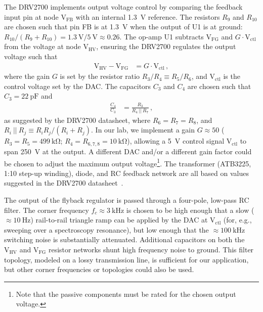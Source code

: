 \documentclass[aip,rsi,reprint]{revtex4-1} %
\begin{document}
The DRV2700 implements output voltage control by comparing the feedback input pin at node $\text{V}_\text{FB}$ with an internal \SI{1.3}{\volt} reference.
The resistors $R_9$ and $R_{10}$ are chosen such that pin FB is at \SI{1.3}{\volt} when the output of U1 is at ground: $R_{10}/(R_9+R_{10}) = \SI{1.3}{\volt}/\SI{5}{\volt} \approx \num{0.26}$.
The op-amp U1 subtracts $\text{V}_\text{FG}$ and $G\cdot \text{V}_\text{ctl}$ from the voltage at node $\text{V}_\text{HV}$, ensuring the DRV2700 regulates the output voltage such that
\begin{align}
\label{Eq:U1Output}
\text{V}_\text{HV} - \text{V}_{\text{FG}} &= G\cdot \text{V}_{\text{ctl}}\,,
\end{align}
where the gain $G$ is set by the resistor ratio $R_3/R_4 \equiv R_5/R_6$, and $\text{V}_\text{ctl}$ is the control voltage set by the DAC.
The capacitors $C_3$ and $C_4$ are chosen such that $C_3 = \SI{22}{\pico\farad}$ and
\begin{align}
\frac{C_4}{C_3} &= \frac{R_3}{R_4~||~R_7}\,,
\end{align}
as suggested by the DRV2700 datasheet\cite{DRV2700Datasheet}, where $R_6 = R_7 = R_8$, and $R_i~||~R_j \equiv R_i R_j/(R_i + R_j)$.
In our lab, we implement a gain $G\approx 50$ ($R_3 = R_5 = \SI{499}{\kilo\ohm}$; $R_4 = R_{6,7,8} = \SI{10}{\kilo\ohm}$), allowing a \SI{5}{\volt} control signal $\text{V}_\text{ctl}$ to span \SI{250}{\volt} at the output. 
A different DAC and/or a different gain factor could be chosen to adjust the maximum output voltage\footnote{Note that the passive components must be rated for the chosen output voltage.}.
The transformer (ATB3225, 1:10 step-up winding), diode, and RC feedback network are all based on values suggested in the DRV2700 datasheet~\cite{DRV2700Datasheet,DRV2700EVMUserGuide}.

The output of the flyback regulator is passed through a four-pole, low-pass RC filter.
The corner frequency $f_c \approx \SI{3}{\kilo\hertz}$ is chosen to be high enough that a slow ($\approx \SI{10}{\hertz}$) rail-to-rail triangle ramp can be applied by the DAC at $\text{V}_\text{ctl}$ (for, e.g., sweeping over a spectroscopy resonance), but low enough that the $\approx \SI{100}{\kilo\hertz}$ switching noise is substantially attenuated.
Additional capacitors on both the $\text{V}_\text{HV}$ and $\text{V}_\text{FG}$ resistor networks shunt high frequency noise to ground.
This filter topology, modeled on a lossy transmission line, is sufficient for our application, but other corner frequencies or topologies could also be used.
\end{document}
